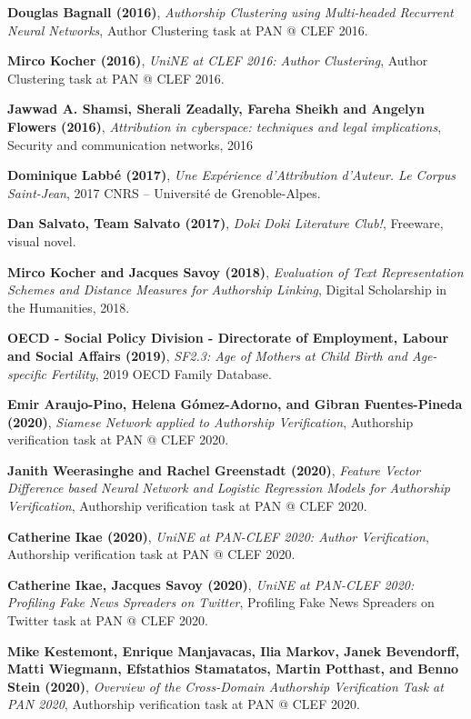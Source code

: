 \begin{thebibliography}{9}
\textbf{Douglas Bagnall (2016)},
\textit{Authorship Clustering using Multi-headed Recurrent Neural Networks},
Author Clustering task at PAN @ CLEF 2016.

\textbf{Mirco Kocher (2016)},
\textit{UniNE at CLEF 2016: Author Clustering},
Author Clustering task at PAN @ CLEF 2016.

\textbf{Jawwad A. Shamsi, Sherali Zeadally, Fareha Sheikh and Angelyn Flowers (2016)},
\textit{Attribution in cyberspace: techniques and legal implications},
Security and communication networks, 2016

\textbf{Dominique Labbé (2017)},
\textit{Une Expérience d’Attribution d’Auteur. Le Corpus Saint-Jean},
2017 CNRS – Université de Grenoble-Alpes.

\textbf{Dan Salvato, Team Salvato (2017)},
\textit{Doki Doki Literature Club!},
Freeware, visual novel.

\textbf{Mirco Kocher and Jacques Savoy (2018)},
\textit{Evaluation of Text Representation Schemes and Distance Measures for Authorship Linking},
Digital Scholarship in the Humanities, 2018.

\textbf{OECD - Social Policy Division - Directorate of Employment, Labour and Social Affairs (2019)},
\textit{SF2.3: Age of Mothers at Child Birth and Age-specific Fertility},
2019 OECD Family Database.

\textbf{Emir Araujo-Pino, Helena Gómez-Adorno, and Gibran Fuentes-Pineda (2020)},
\textit{Siamese Network applied to Authorship Verification},
Authorship verification task at PAN @ CLEF 2020.

\textbf{Janith Weerasinghe and Rachel Greenstadt (2020)},
\textit{Feature Vector Difference based Neural Network and Logistic Regression Models for Authorship Verification},
Authorship verification task at PAN @ CLEF 2020.

\textbf{Catherine Ikae (2020)},
\textit{UniNE at PAN-CLEF 2020: Author Verification},
Authorship verification task at PAN @ CLEF 2020.

\textbf{Catherine Ikae, Jacques Savoy (2020)},
\textit{UniNE at PAN-CLEF 2020: Profiling Fake News Spreaders on Twitter},
Profiling Fake News Spreaders on Twitter task at PAN @ CLEF 2020.

\textbf{Mike Kestemont, Enrique Manjavacas, Ilia Markov, Janek Bevendorff, Matti Wiegmann, Efstathios Stamatatos, Martin Potthast, and Benno Stein (2020)},
\textit{Overview of the Cross-Domain Authorship Verification Task at PAN 2020},
Authorship verification task at PAN @ CLEF 2020.


\end{thebibliography}
